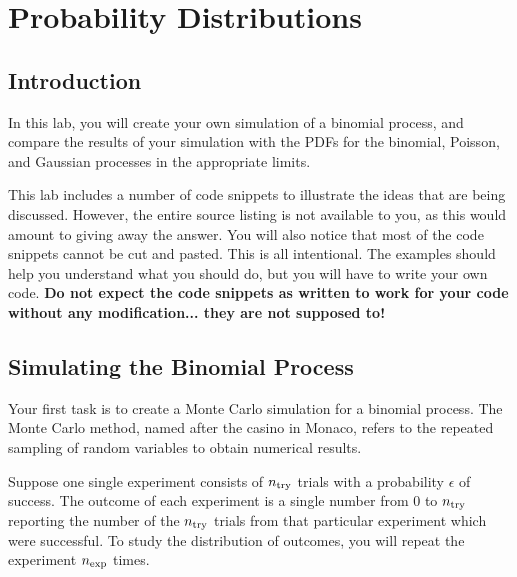 \chapter{Probability Distributions}

\section{Introduction}

In this lab, you will create your own simulation of a binomial
process, and compare the results of your simulation with the PDFs for
the binomial, Poisson, and Gaussian processes in the appropriate
limits.

This lab includes a number of code snippets to illustrate the ideas
that are being discussed.  However, the entire source listing is not
available to you, as this would amount to giving away the answer.  You
will also notice that most of the code snippets cannot be cut and
pasted.  This is all intentional.  The examples should help you
understand what you should do, but you will have to write your own
code.  {\bf Do not expect the code snippets as written to work for
your code without any modification... they are not supposed to!}

\section{Simulating the Binomial Process}

Your first task is to create a Monte Carlo simulation for a binomial
process.  The Monte Carlo method, named after the casino in Monaco, refers
to the repeated sampling of random variables to obtain numerical results.

Suppose one single experiment consists of $n_{\rm try}$ trials with a
probability $\epsilon$ of success.  The outcome of each experiment is
a single number from 0 to $n_{\rm try}$ reporting the number of the
$n_{\rm try}$ trials from that particular experiment which were
successful.  To study the distribution of outcomes, you will repeat the
experiment $n_{\rm exp}$ times.


